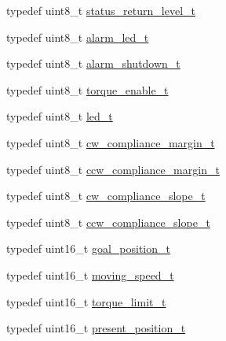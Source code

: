 \begin{DoxyCompactItemize}
\item 
typedef uint8\+\_\+t \hyperlink{structdynamixel_1_1servos_1_1_model_traits_3_01_ex106_01_4_1_1_c_t_a1bb06e92b9d4a3c2d9025a6592719f4e}{status\+\_\+return\+\_\+level\+\_\+t}
\item 
typedef uint8\+\_\+t \hyperlink{structdynamixel_1_1servos_1_1_model_traits_3_01_ex106_01_4_1_1_c_t_aa7d5cdcf71c0a1a6c583cbb719b9d8b1}{alarm\+\_\+led\+\_\+t}
\item 
typedef uint8\+\_\+t \hyperlink{structdynamixel_1_1servos_1_1_model_traits_3_01_ex106_01_4_1_1_c_t_ad2ef83246416e16b0ddbd3de0c8e90fc}{alarm\+\_\+shutdown\+\_\+t}
\item 
typedef uint8\+\_\+t \hyperlink{structdynamixel_1_1servos_1_1_model_traits_3_01_ex106_01_4_1_1_c_t_a74af69745ca72204a2a177ca39033e39}{torque\+\_\+enable\+\_\+t}
\item 
typedef uint8\+\_\+t \hyperlink{structdynamixel_1_1servos_1_1_model_traits_3_01_ex106_01_4_1_1_c_t_a5e4eecfa6c26711d0c9b1ab7776f59f9}{led\+\_\+t}
\item 
typedef uint8\+\_\+t \hyperlink{structdynamixel_1_1servos_1_1_model_traits_3_01_ex106_01_4_1_1_c_t_a08b944cbbba36332ba8c85211669146f}{cw\+\_\+compliance\+\_\+margin\+\_\+t}
\item 
typedef uint8\+\_\+t \hyperlink{structdynamixel_1_1servos_1_1_model_traits_3_01_ex106_01_4_1_1_c_t_a83f29c01b2a7b66fb485a494e5c441ae}{ccw\+\_\+compliance\+\_\+margin\+\_\+t}
\item 
typedef uint8\+\_\+t \hyperlink{structdynamixel_1_1servos_1_1_model_traits_3_01_ex106_01_4_1_1_c_t_a75d5d3ae0fc5976e854017af52dbf09b}{cw\+\_\+compliance\+\_\+slope\+\_\+t}
\item 
typedef uint8\+\_\+t \hyperlink{structdynamixel_1_1servos_1_1_model_traits_3_01_ex106_01_4_1_1_c_t_a8deecebcb845496af2888b0da2b8962e}{ccw\+\_\+compliance\+\_\+slope\+\_\+t}
\item 
typedef uint16\+\_\+t \hyperlink{structdynamixel_1_1servos_1_1_model_traits_3_01_ex106_01_4_1_1_c_t_ade66d9df3890c050627762b347e7ef7a}{goal\+\_\+position\+\_\+t}
\item 
typedef uint16\+\_\+t \hyperlink{structdynamixel_1_1servos_1_1_model_traits_3_01_ex106_01_4_1_1_c_t_ae57f9a7f5645d154e985231cc25df19d}{moving\+\_\+speed\+\_\+t}
\item 
typedef uint16\+\_\+t \hyperlink{structdynamixel_1_1servos_1_1_model_traits_3_01_ex106_01_4_1_1_c_t_a9443fe60ff3d93c262cd6ab32990842d}{torque\+\_\+limit\+\_\+t}
\item 
typedef uint16\+\_\+t \hyperlink{structdynamixel_1_1servos_1_1_model_traits_3_01_ex106_01_4_1_1_c_t_a4f6bf16e6b395481ce865abe88d58a20}{present\+\_\+position\+\_\+t}

\end{DoxyCompactItemize}
